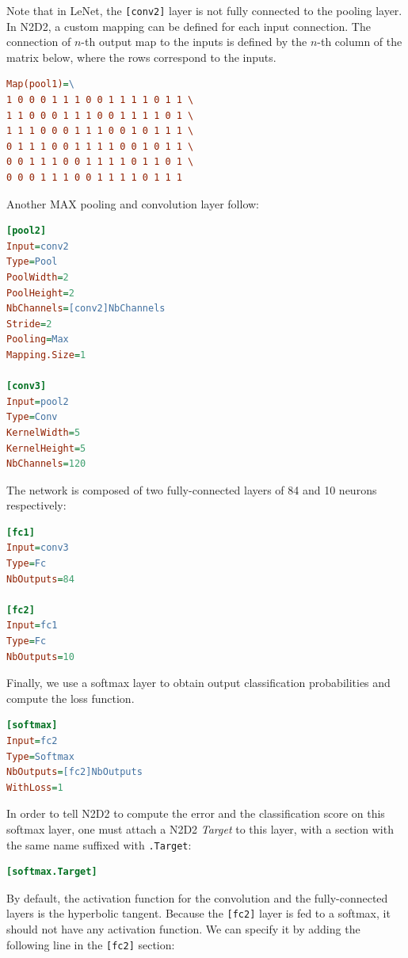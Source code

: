 \documentclass[a4paper,11pt,oneside]{article}
\begin{document}
Note that in LeNet, the \lstinline![conv2]! layer is not fully connected to the
pooling layer. In N2D2, a custom mapping can be defined for each input
connection. The connection of $n$-th output map to the inputs is defined by the
$n$-th column of the matrix below, where the rows correspond to the inputs.

\begin{lstlisting}[language=ini]
Map(pool1)=\
1 0 0 0 1 1 1 0 0 1 1 1 1 0 1 1 \
1 1 0 0 0 1 1 1 0 0 1 1 1 1 0 1 \
1 1 1 0 0 0 1 1 1 0 0 1 0 1 1 1 \
0 1 1 1 0 0 1 1 1 1 0 0 1 0 1 1 \
0 0 1 1 1 0 0 1 1 1 1 0 1 1 0 1 \
0 0 0 1 1 1 0 0 1 1 1 1 0 1 1 1
\end{lstlisting}

Another MAX pooling and convolution layer follow:

\begin{lstlisting}[language=ini]
[pool2]
Input=conv2
Type=Pool
PoolWidth=2
PoolHeight=2
NbChannels=[conv2]NbChannels
Stride=2
Pooling=Max
Mapping.Size=1

[conv3]
Input=pool2
Type=Conv
KernelWidth=5
KernelHeight=5
NbChannels=120
\end{lstlisting}

The network is composed of two fully-connected layers of 84 and 10 neurons
respectively:

\begin{lstlisting}[language=ini]
[fc1]
Input=conv3
Type=Fc
NbOutputs=84

[fc2]
Input=fc1
Type=Fc
NbOutputs=10
\end{lstlisting}

Finally, we use a softmax layer to obtain output classification probabilities
and compute the loss function.

\begin{lstlisting}[language=ini]
[softmax]
Input=fc2
Type=Softmax
NbOutputs=[fc2]NbOutputs
WithLoss=1
\end{lstlisting}

In order to tell N2D2 to compute the error and the classification score on this
softmax layer, one must attach a N2D2 \emph{Target} to this layer, with a
section with the same name suffixed with \lstinline!.Target!:

\begin{lstlisting}[language=ini]
[softmax.Target]
\end{lstlisting}

By default, the activation function for the convolution and the fully-connected
layers is the hyperbolic tangent. Because the \lstinline![fc2]! layer is fed
to a softmax, it should not have any activation function. We can specify it by
adding the following line in the \lstinline![fc2]! section:
\end{document}
